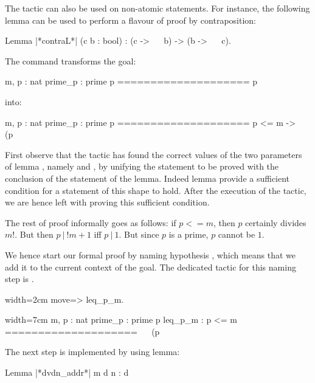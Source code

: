 The  tactic can also be used on non-atomic statements. For
instance, the following lemma can be used to perform a flavour of
proof by contraposition:

\begin{coq}{}{}
Lemma |*contraL*| (c b : bool) : (c -> ~~ b) -> (b -> ~~ c).
\end{coq}

The command  transforms the goal:

\begin{coq}{}{}
m, p : nat
prime_p : prime p
====================
p %
\end{coq}

into:

\begin{coqout}{}{}
m, p : nat
prime_p : prime p
====================
 p <= m -> ~~ (p %
\end{coqout}

First observe that the  tactic has found the correct values
of the two parameters  of lemma , namely
 and , by unifying the statement to be
proved with the conclusion  of the statement of the lemma.
Indeed lemma  provide a sufficient condition for a
statement of this shape to hold. After the execution of the tactic, we
are hence left with proving this sufficient condition.

The rest of proof informally goes as follows: if $p <= m$, then $p$
certainly divides $m!$. But then $p\ |\ !m + 1$ iff $p\ |\ 1$. But
since $p$ is a prime, $p$ cannot be $1$.

We hence start our formal proof by naming hypothesis , which
means that we add it to the current context of the goal. The dedicated
tactic for this naming step is .

\begin{coq}{}{width=2cm}
move=> leq_p_m.
\end{coq}
\begin{coqout}{}{width=7cm}
m, p : nat
prime_p : prime p
leq_p_m :  p <= m
====================
 ~~ (p %
\end{coqout}

The next step is implemented by using lemma:

\begin{coq}{}{}
Lemma |*dvdn_addr*| m d n : d %
\end{coq}

